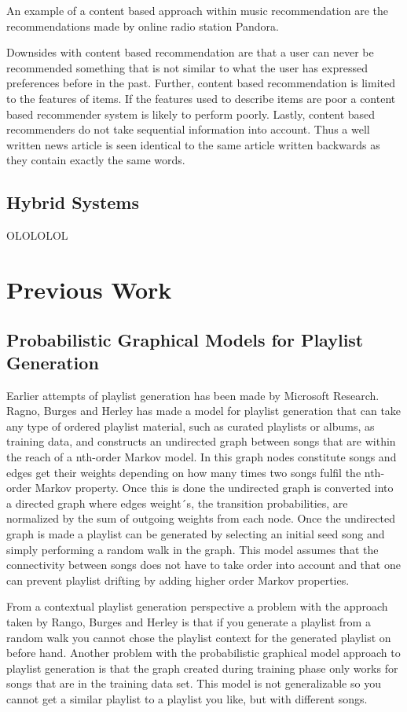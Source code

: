 \documentclass[a4paper,11pt]{kth-mag}
\begin{document}
An example of a content based approach within music recommendation are the recommendations made by online radio station Pandora. 

Downsides with content based recommendation are that a user can never be recommended something that is not similar to what the user has expressed preferences before in the past. Further, content based recommendation is limited to the features of items. If the features used to describe items are poor a content based recommender system is likely to perform poorly. Lastly, content based recommenders do not take sequential information into account. Thus a well written news article is seen identical to the same article written backwards as they contain exactly the same words\cite{adomavicius2005toward}.

\section{Hybrid Systems}
OLOLOLOL

\chapter{Previous Work}
\section{Probabilistic Graphical Models for Playlist Generation}
Earlier attempts of playlist generation has been made by Microsoft Research. Ragno, Burges and Herley has made a model for playlist generation that can take any type of ordered playlist material, such as curated playlists or albums, as training data, and constructs an undirected graph between songs that are within the reach of a nth-order Markov model. In this graph nodes constitute songs and edges get their weights depending on how many times two songs fulfil the nth-order Markov property. Once this is done the undirected graph is converted into a directed graph where edges weight´s, the transition probabilities, are normalized by the sum of outgoing weights from each node. Once the undirected graph is made a playlist can be generated by selecting an initial seed song and simply performing a random walk in the graph. This model assumes that the connectivity between songs does not have to take order into account and that one can prevent playlist drifting by adding higher order Markov properties\cite{ragno2005inferring}. 

From a contextual playlist generation perspective a problem with the approach taken by Rango, Burges and Herley is that if you generate a playlist from a random walk you cannot chose the playlist context for the generated playlist on before hand. Another problem with the probabilistic graphical model approach to playlist generation is that the graph created during training phase only works for songs that are in the training data set. This model is not generalizable so you cannot get a similar playlist to a playlist you like, but with different songs.
\end{document}
